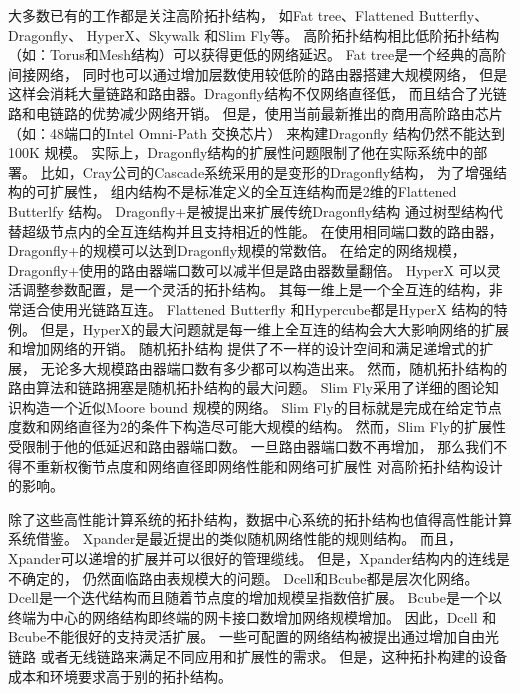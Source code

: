 大多数已有的工作都是关注高阶拓扑结构，
如Fat tree、Flattened Butterfly、Dragonfly、
HyperX、Skywalk 和Slim Fly等。
高阶拓扑结构相比低阶拓扑结构（如：Torus和Mesh结构）可以获得更低的网络延迟。
Fat tree是一个经典的高阶间接网络，
同时也可以通过增加层数使用较低阶的路由器搭建大规模网络，
但是这样会消耗大量链路和路由器。Dragonfly结构不仅网络直径低，
而且结合了光链路和电链路的优势减少网络开销。
但是，使用当前最新推出的商用高阶路由芯片
（如：48端口的Intel Omni-Path 交换芯片）
来构建Dragonfly 结构仍然不能达到100K 规模。
实际上，Dragonfly结构的扩展性问题限制了他在实际系统中的部署。
比如，Cray公司的Cascade系统采用的是变形的Dragonfly结构，
为了增强结构的可扩展性，
组内结构不是标准定义的全互连结构而是2维的Flattened Butterlfy 结构。
Dragonfly+是被提出来扩展传统Dragonfly结构
通过树型结构代替超级节点内的全互连结构并且支持相近的性能。
在使用相同端口数的路由器，Dragonfly+的规模可以达到Dragonfly规模的常数倍。
在给定的网络规模，Dragonfly+使用的路由器端口数可以减半但是路由器数量翻倍。
HyperX 可以灵活调整参数配置，是一个灵活的拓扑结构。
其每一维上是一个全互连的结构，非常适合使用光链路互连。
Flattened Butterfly 和Hypercube都是HyperX 结构的特例。
但是，HyperX的最大问题就是每一维上全互连的结构会大大影响网络的扩展和增加网络的开销。
随机拓扑结构
提供了不一样的设计空间和满足递增式的扩展，
无论多大规模路由器端口数有多少都可以构造出来。
然而，随机拓扑结构的路由算法和链路拥塞是随机拓扑结构的最大问题。
Slim Fly采用了详细的图论知识构造一个近似Moore bound 规模的网络。
Slim Fly的目标就是完成在给定节点度数和网络直径为2的条件下构造尽可能大规模的结构。
然而，Slim Fly的扩展性受限制于他的低延迟和路由器端口数。
一旦路由器端口数不再增加，
那么我们不得不重新权衡节点度和网络直径即网络性能和网络可扩展性
对高阶拓扑结构设计的影响。

除了这些高性能计算系统的拓扑结构，数据中心系统的拓扑结构也值得高性能计算系统借鉴。
Xpander是最近提出的类似随机网络性能的规则结构。
而且，Xpander可以递增的扩展并可以很好的管理缆线。
但是，Xpander结构内的连线是不确定的，
仍然面临路由表规模大的问题。
Dcell和Bcube都是层次化网络。
Dcell是一个迭代结构而且随着节点度的增加规模呈指数倍扩展。
Bcube是一个以终端为中心的网络结构即终端的网卡接口数增加网络规模增加。
因此，Dcell 和Bcube不能很好的支持灵活扩展。
一些可配置的网络结构被提出通过增加自由光链路
或者无线链路来满足不同应用和扩展性的需求。
但是，这种拓扑构建的设备成本和环境要求高于别的拓扑结构。

